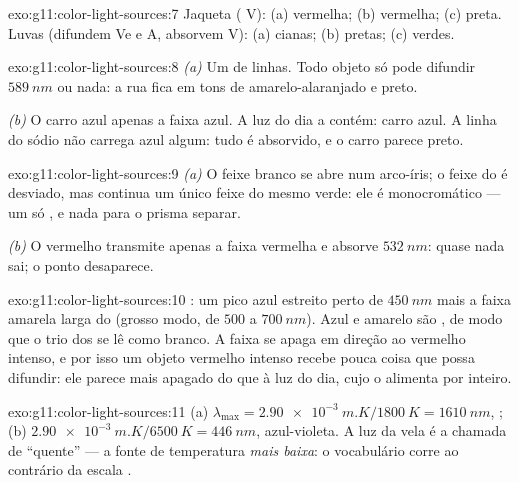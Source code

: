 \begin{solution}{exo:g11:color-light-sources:7}
Jaqueta ( V): (a) vermelha; (b) vermelha; (c) preta. Luvas
(difundem Ve e A, absorvem V): (a) cianas; (b) pretas; (c) verdes.
\end{solution}

\begin{solution}{exo:g11:color-light-sources:8}
\emph{(a)} Um  de linhas. Todo objeto só pode difundir
$\qty{589}{nm}$ ou nada: a rua fica em tons de amarelo-alaranjado e
preto.

\emph{(b)} O carro azul  apenas a faixa azul. A luz do dia a
contém: carro azul. A linha do sódio não carrega azul algum: tudo é
absorvido, e o carro parece preto.
\end{solution}

\begin{solution}{exo:g11:color-light-sources:9}
\emph{(a)} O feixe branco se abre num arco-íris; o feixe do  é
desviado, mas continua um único feixe do mesmo verde: ele é
monocromático --- um só , e nada para o prisma
separar.

\emph{(b)} O  vermelho transmite apenas a faixa vermelha e absorve
$\qty{532}{nm}$: quase nada sai; o ponto desaparece.
\end{solution}

\begin{solution}{exo:g11:color-light-sources:10}
: um pico azul estreito perto de $\qty{450}{nm}$ mais a faixa
amarela larga do  (grosso modo, de $500$ a $\qty{700}{nm}$). Azul
e amarelo são , de modo que o trio dos  se lê como
branco. A faixa se apaga em direção ao vermelho intenso, e por isso um
objeto vermelho intenso recebe pouca coisa que possa difundir: ele parece
mais apagado do que à luz do dia, cujo  o alimenta por
inteiro.
\end{solution}

\begin{solution}{exo:g11:color-light-sources:11}
(a) $\lambda_{\max} = \qty{2.90e-3}{m.K}/\qty{1800}{K} = \qty{1610}{nm}$,
; (b) $\qty{2.90e-3}{m.K}/\qty{6500}{K} = \qty{446}{nm}$,
azul-violeta. A luz da vela é a chamada de ``quente'' --- a fonte de
temperatura \emph{mais baixa}: o vocabulário corre ao contrário da escala
.
\end{solution}

